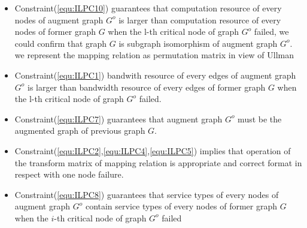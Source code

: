 \begin{itemize}
\item Constraint(\ref{equ:ILPC10}) guarantees that computation resource of every nodes of augment graph $G^o$ is larger than computation resource of every nodes of former graph $G$ when the l-th critical node of graph $G^o$ failed, we could confirm that graph $G$ is subgraph isomorphism of augment graph $G^o$. we represent the mapping relation as permutation matrix in view of Ullman\cite{ullmann1976algorithm}
\item Constraint(\ref{equ:ILPC1}) bandwith resource of every edges of augment graph $G^o$ is larger than bandwidth resource of every edges of former graph $G$ when the l-th critical node of graph $G^o$ failed.

\item Constraint(\ref{equ:ILPC7}) guarantees that augment graph $G^o$ must be the augmented graph of previous graph $G$.
\item Constraint(\ref{equ:ILPC2},\ref{equ:ILPC4},\ref{equ:ILPC5}) implies that operation of the transform matrix of mapping relation is appropriate and correct format in respect with one node failure.
\item Constraint(\ref{equ:ILPC8}) guarantees that  service types of every nodes of augment graph $G^o$ contain service types of every nodes of former graph $G$ when the $i$-th critical node of graph $G^o$ failed
\end{itemize}
%
%

